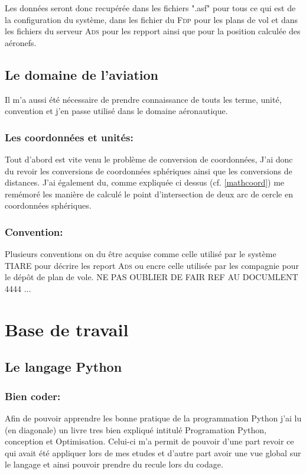 Les données seront donc recupérée dans les fichiers ".asf" pour tous ce qui est de la configuration du système, dans les fichier du \textsc{Fdp} pour les plans de vol et dans les fichiers du serveur \textsc{Ads} pour les repport ainsi que pour la position calculée des aéronefs.

    \subsection{Le domaine de l'aviation}
Il m'a aussi été nécessaire de prendre connaissance de touts les terme, unité, convention et j'en passe utilisé dans le domaine aéronautique.

        \subsubsection{Les coordonnées et unités:}
Tout d'abord est vite venu le problème de conversion de coordonnées, J'ai donc du revoir les conversions de coordonnées sphériques ainsi que les conversions de distances.
J'ai également du, comme expliquée ci dessus (cf. \vref{mathcoord})
me remémoré les manière de calculé le point d'intersection de deux arc de cercle en coordonnées sphériques.

        \subsubsection{Convention:}
Plusieurs conventions on du être acquise comme celle utilisé par le système TIARE pour décrire les report \textsc{Ads} ou encre celle utilisée par les compagnie pour le dépôt de plan de vole.
NE PAS OUBLIER DE FAIR REF AU DOCUMLENT 4444 ...





\section{Base de travail}
    \subsection{Le langage Python}
        \subsubsection{Bien coder:\label{pygood}}
Afin de pouvoir apprendre les bonne pratique de la programmation Python\cite{pybook} j'ai lu (en diagonale) un livre tres bien expliqué intitulé Programation Python, conception et Optimisation. Celui-ci m'a permit de pouvoir d'une part revoir ce qui avait été appliquer lors de mes etudes et d'autre part avoir une vue global sur le langage et ainsi pouvoir prendre du recule lors du codage.


